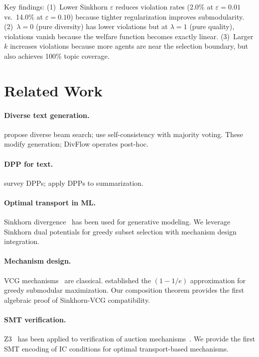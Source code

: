 \documentclass[10pt]{article}
\begin{document}
Key findings: (1)~Lower Sinkhorn $\varepsilon$ reduces violation rates (2.0\% at $\varepsilon=0.01$ vs.\ 14.0\% at $\varepsilon=0.10$) because tighter regularization improves submodularity.
(2)~$\lambda=0$ (pure diversity) has lower violations but at $\lambda=1$ (pure quality), violations vanish because the welfare function becomes exactly linear.
(3)~Larger $k$ increases violations because more agents are near the selection boundary, but also achieves 100\% topic coverage.

\section{Related Work}
\label{sec:related}

\paragraph{Diverse text generation.}
\citet{li2023diverse} propose diverse beam search; \citet{wang2023selfconsistency} use self-consistency with majority voting.
These modify generation; DivFlow operates post-hoc.

\paragraph{DPP for text.}
\citet{kulesza2012determinantal} survey DPPs; \citet{cho2019multi} apply DPPs to summarization.

\paragraph{Optimal transport in ML.}
Sinkhorn divergence~\citep{cuturi2013sinkhorn, feydy2019interpolating} has been used for generative modeling.
We leverage Sinkhorn dual potentials for greedy subset selection with mechanism design integration.

\paragraph{Mechanism design.}
VCG mechanisms~\citep{vickrey1961counterspeculation, groves1973incentives} are classical.
\citet{nemhauser1978analysis} established the $(1-1/e)$ approximation for greedy submodular maximization.
Our composition theorem provides the first algebraic proof of Sinkhorn-VCG compatibility.

\paragraph{SMT verification.}
Z3~\citep{demoura2008z3} has been applied to verification of auction mechanisms~\citep{brandt2017rolling}.
We provide the first SMT encoding of IC conditions for optimal transport-based mechanisms.
\end{document}
